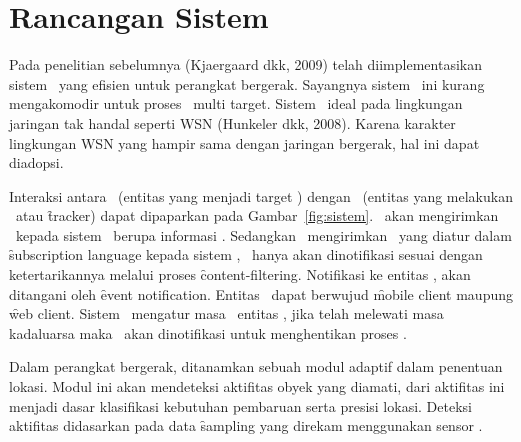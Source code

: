 
\section{Rancangan Sistem}

Pada penelitian sebelumnya (Kjaergaard dkk, 2009) telah diimplementasikan
sistem \tracking~yang efisien untuk perangkat bergerak. Sayangnya sistem
\tracking~ini kurang mengakomodir untuk proses \tracking~multi target. Sistem
\pubsub~ideal pada lingkungan jaringan tak handal seperti WSN (Hunkeler dkk,
2008). Karena karakter lingkungan WSN yang hampir sama dengan jaringan
bergerak, hal ini dapat diadopsi.

Interaksi antara \publisher~(entitas yang menjadi target \tracking) dengan
\subscriber~(entitas yang melakukan \tracking~atau \f{tracker}) dapat dipaparkan
pada Gambar~\ref{fig:sistem}.  \Publisher~akan mengirimkan \event~kepada sistem
\pubsub~berupa informasi \tracking.  Sedangkan \subscriber~mengirimkan
\subscription~yang diatur dalam \f{subscription language} kepada sistem \pubsub,
\subscriber~hanya akan dinotifikasi sesuai dengan ketertarikannya melalui proses
\f{content-filtering}. Notifikasi ke entitas \subscriber, akan ditangani oleh
\f{event notification}. Entitas \subscriber~dapat berwujud \f{mobile client}
maupung \f{web client}. Sistem \pubsub~mengatur masa \subscription~entitas
\subscriber, jika telah melewati masa kadaluarsa maka \publisher~akan
dinotifikasi untuk menghentikan proses \publish.

Dalam perangkat bergerak, ditanamkan sebuah modul adaptif dalam penentuan
lokasi.  Modul ini akan mendeteksi aktifitas obyek yang diamati, dari aktifitas
ini menjadi dasar klasifikasi kebutuhan pembaruan serta presisi lokasi. Deteksi
aktifitas didasarkan pada data \f{sampling} yang direkam menggunakan sensor
\acc.




